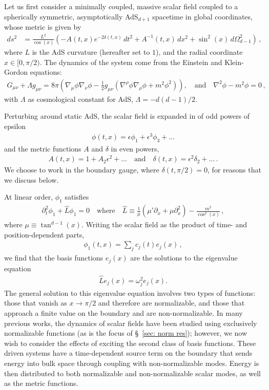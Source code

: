 \documentclass[letterpaper,11pt]{article}
\newcommand{\p}{\partial}
\begin{document}
Let us first consider a minimally coupled, massive scalar field coupled to a spherically symmetric, asymptotically AdS$_{d+1}$ spacetime in global coordinates, whose metric is given by
\begin{align}
\label{AdS metric}
ds^2 &= \frac{L^2}{\cos(x)} \left( - A(t,x) e^{-2 \delta(t,x)} \, dt^2 + A^{-1}(t, x) \, dx^2 + \sin^2 (x) \, d\Omega^2_{d-1} \right) \, ,
\end{align}
where $L$ is the AdS curvature (hereafter set to $1$), and the radial coordinate $x \in [0, \pi/2)$. The dynamics of the system come from the Einstein and Klein-Gordon equations:
\begin{align}
G_{\mu \nu} + \Lambda g_{\mu \nu} = 8 \pi \left( \nabla_\mu \phi \nabla_\nu \phi - \frac{1}{2} g_{\mu \nu} \left( \nabla^\rho \phi \nabla_\rho \phi + m^2 \phi^2 \right) \right), \quad \text{and} \quad \nabla^2 \phi - m^2 \phi = 0 \, ,
\end{align}
with $\Lambda$ as cosmological constant for AdS, $\Lambda = -d(d-1)/2$. 

Perturbing around static AdS, the scalar field is expanded in of odd powers of epsilon 
\begin{align}
\phi(t,x) = \epsilon \phi_1 + \epsilon^3 \phi_3 + \ldots
\end{align}
and the metric functions $A$ and $\delta$ in even powers,
\begin{align}
A(t, x) = 1 + A_2 \epsilon^2 + \ldots \quad \text{and} \quad \delta(t, x) = \epsilon^2 \delta_2 + \ldots \, .
\end{align}
We choose to work in the boundary gauge, where $\delta(t, \pi/2) = 0$, for reasons that we discuss below.

At linear order, $\phi_1$ satisfies
\begin{align}
\label{phi1 eqn}
\p^2_t \phi_1 + \hat L \phi_1 = 0 \quad \text{where} \quad \hat{L} \equiv \frac{1}{\mu} (\mu' \p_x + \mu \p^2_x)  - \frac{m^2}{\cos^2(x)} \, ,
\end{align}
where $\mu \equiv \tan^{d-1}(x)$. Writing the scalar field as the product of time- and position-dependent parts,
\begin{align}
\phi_1 (t, x) = \sum_j c_j (t) e_j (x) \, ,
\end{align}
we find that the basis functions $e_j (x)$ are the solutions to the eigenvalue equation
\begin{align}
\label{eigen eqn}
\hat L e_j(x) = \omega^2_j e_j(x) .
\end{align}
The general solution to this eigenvalue equation involves two types of functions: those that vanish as $x \to \pi / 2$ and therefore are normalizable, and those that approach a finite value on the boundary and are non-normalizable. In many previous works, the dynamics of scalar fields have been studied using exclusively normalizable functions (as is the focus of \S\!~\ref{sec: norm res}); however, we now wish to consider the effects of exciting the second class of basis functions. These driven systems have a time-dependent source term on the boundary that sends energy into bulk space through coupling with non-normalizable modes. Energy is then distributed to both normalizable and non-normalizable scalar modes, as well as the metric functions. 
\end{document}
